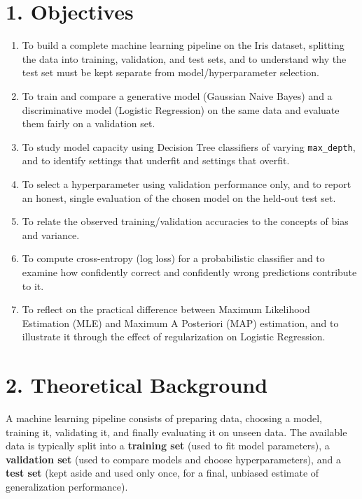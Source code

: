 \documentclass[12pt,a4paper]{article}
\begin{document}
\vfill
\newpage

\section*{1. Objectives}

\begin{enumerate}[leftmargin=1.6em]
  \item To build a complete machine learning pipeline on the Iris dataset, splitting the data into training, validation, and test sets, and to understand why the test set must be kept separate from model/hyperparameter selection.
  \item To train and compare a generative model (Gaussian Naive Bayes) and a discriminative model (Logistic Regression) on the same data and evaluate them fairly on a validation set.
  \item To study model capacity using Decision Tree classifiers of varying \texttt{max\_depth}, and to identify settings that underfit and settings that overfit.
  \item To select a hyperparameter using validation performance only, and to report an honest, single evaluation of the chosen model on the held-out test set.
  \item To relate the observed training/validation accuracies to the concepts of bias and variance.
  \item To compute cross-entropy (log loss) for a probabilistic classifier and to examine how confidently correct and confidently wrong predictions contribute to it.
  \item To reflect on the practical difference between Maximum Likelihood Estimation (MLE) and Maximum A Posteriori (MAP) estimation, and to illustrate it through the effect of regularization on Logistic Regression.
\end{enumerate}

\section*{2. Theoretical Background}

A machine learning pipeline consists of preparing data, choosing a model, training it, validating it, and finally evaluating it on unseen data. The available data is typically split into a \textbf{training set} (used to fit model parameters), a \textbf{validation set} (used to compare models and choose hyperparameters), and a \textbf{test set} (kept aside and used only once, for a final, unbiased estimate of generalization performance).
\end{document}
